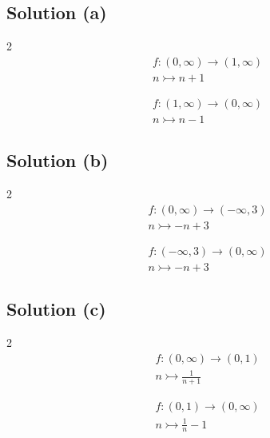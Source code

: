 \documentclass[12pt]{report}
\begin{document}
\subsection{Solution (a)}
\begin{multicols}{2}
    \begin{gather}
        f : (0,\infty) \to (1,\infty)\\
        n \rightarrowtail n + 1
    \end{gather}
    
    \columnbreak
    \begin{gather}
        f : (1,\infty) \to (0,\infty)\\
        n \rightarrowtail n - 1
    \end{gather}
\end{multicols}

\subsection{Solution (b)}
\begin{multicols}{2}
    \begin{gather}
        f : (0,\infty) \to (-\infty, 3)\\
        n \rightarrowtail -n + 3
    \end{gather}

    \columnbreak
    \begin{gather}
        f : (-\infty, 3) \to (0,\infty)\\
        n \rightarrowtail -n + 3
    \end{gather}
    
\end{multicols}

\subsection{Solution (c)}
\begin{multicols}{2}
    \begin{gather}
        f : (0,\infty) \to (0,1)\\
        n \rightarrowtail \frac{1}{n + 1}
    \end{gather}

    \columnbreak
    \begin{gather}
        f : (0,1) \to (0,\infty)\\
        n \rightarrowtail \frac{1}{n} - 1
    \end{gather}
    
\end{multicols}
\end{document}
